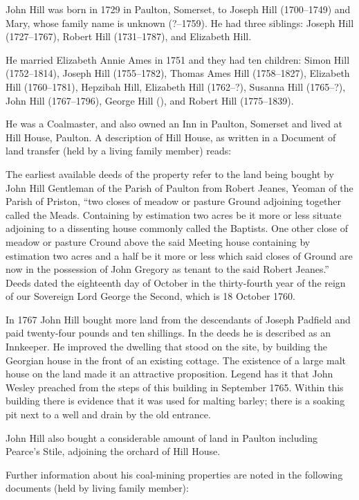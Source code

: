 
John Hill was born in 1729 in Paulton, Somerset, to Joseph Hill (1700--1749) and Mary, whose family name is unknown (?--1759). He had three siblings: Joseph Hill (1727--1767), Robert Hill (1731--1787), and Elizabeth Hill.

He married Elizabeth Annie Ames in 1751 and they had ten children: Simon Hill (1752--1814), Joseph Hill (1755--1782),
Thomas Ames Hill (1758--1827), Elizabeth Hill (1760--1781), Hepzibah Hill, Elizabeth Hill (1762--?), Susanna Hill (1765--?), John Hill (1767--1796), George Hill (), and Robert Hill (1775--1839).

He was a Coalmaster, and also owned an Inn in Paulton, Somerset and lived at Hill House, Paulton. A description of  Hill House, as written in a Document of land transfer (held by a living family member) reads:

The earliest available deeds of the property refer to the land being bought by John Hill Gentleman of the Parish of Paulton from Robert Jeanes, Yeoman of the Parish of Priston, ``two closes of meadow or pasture Ground adjoining together called the Meads. Containing by estimation two acres be it more or less situate adjoining to a dissenting house commonly called the Baptists. One other close of meadow or pasture Cround above the said Meeting house containing by estimation two acres and a half be it more or less which said closes of Ground are now in the possession of John Gregory as tenant to the said Robert Jeanes.'' Deeds dated the eighteenth day of October in the thirty-fourth year of the reign of our Sovereign Lord George the Second, which is 18 October 1760.

In 1767 John Hill bought more land from the descendants of Joseph Padfield and paid twenty-four pounds and ten shillings. In the deeds he is described as an Innkeeper. He improved the dwelling that stood on the site, by building the Georgian house in the front of an existing cottage. The existence of a large malt house on the land made it an attractive proposition. Legend has it that John Wesley preached from the steps of this building in September 1765. Within this building there is evidence that it was used for malting barley; there is a soaking pit next to a well and drain by the old entrance.

John Hill also bought a considerable amount of land in Paulton including Pearce's Stile, adjoining the orchard of Hill House.

Further information about his coal-mining properties are noted in the following documents (held by living family member):


